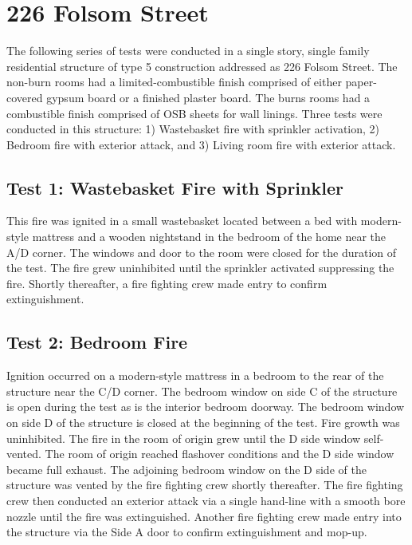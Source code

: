 \documentclass[12pt,oneside]{book}
\begin{document}
\section{226 Folsom Street}

The following series of tests were conducted in a single story, single family residential structure of type 5 construction addressed as 226 Folsom Street. The non-burn rooms had a limited-combustible finish comprised of either paper-covered gypsum board or a finished plaster board. The burns rooms had a combustible finish comprised of OSB sheets for wall linings. Three tests were conducted in this structure: 1) Wastebasket fire with sprinkler activation, 2) Bedroom fire with exterior attack, and 3) Living room fire with exterior attack. 

\subsection{Test 1: Wastebasket Fire with Sprinkler}

This fire was ignited in a small wastebasket located between a bed with modern-style mattress and a wooden nightstand in the bedroom of the home near the A/D corner. The windows and door to the room were closed for the duration of the test. The fire grew uninhibited until the sprinkler activated suppressing the fire. Shortly thereafter, a fire fighting crew made entry to confirm extinguishment.

\subsection{Test 2: Bedroom Fire}

Ignition occurred on a modern-style mattress in a bedroom to the rear of the structure near the C/D corner. The bedroom window on side C of the structure is open during the test as is the interior bedroom doorway. The bedroom window on side D of the structure is closed at the beginning of the test. Fire growth was uninhibited. The fire in the room of origin grew until the D side window self-vented. The room of origin reached flashover conditions and the D side window became full exhaust. The adjoining bedroom window on the D side of the structure was vented by the fire fighting crew shortly thereafter. The fire fighting crew then conducted an exterior attack via a single hand-line with a smooth bore nozzle until the fire was extinguished. Another fire fighting crew made entry into the structure via the Side A door to confirm extinguishment and mop-up.
\end{document}
